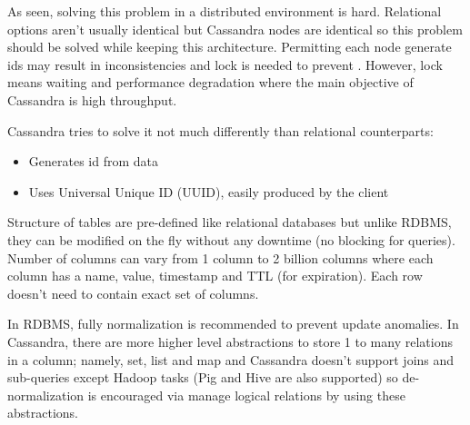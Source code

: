 As seen, solving this problem in a distributed environment is hard. Relational options aren't usually identical but Cassandra nodes are identical so this problem should be solved while keeping this architecture. Permitting each node generate ids may result in inconsistencies and lock is needed to prevent . However, lock means waiting and performance degradation where the main objective of Cassandra is high throughput.

Cassandra tries to solve it not much differently than relational counterparts:
\begin{itemize}
  \item Generates id from data
  \item Uses Universal Unique ID (UUID), easily produced by the client
\end{itemize}

Structure of tables are pre-defined like relational databases but unlike RDBMS, they can be modified on the fly without any downtime (no blocking for queries). Number of columns can vary from 1 column to 2 billion columns where each column has a name, value, timestamp and TTL (for expiration). Each row doesn't need to contain exact set of columns.

In RDBMS, fully normalization is recommended to prevent update anomalies. In Cassandra, there are more higher level abstractions to store 1 to many relations in a column; namely, set, list and map and Cassandra doesn't support joins and sub-queries except Hadoop tasks (Pig and Hive are also supported) so de-normalization is encouraged via manage logical relations by using these abstractions.

